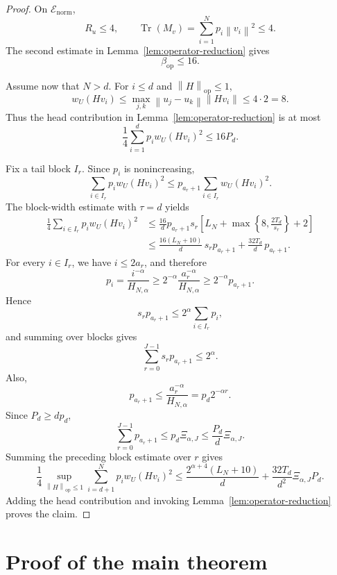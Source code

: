 \documentclass[11pt]{article}
\newcommand{\1}{\mathbf{1}}
\newcommand{\op}{\mathrm{op}}
\newcommand{\Tr}{\operatorname{Tr}}
\newcommand{\norm}[1]{\left\|#1\right\|}
\begin{document}
\begin{proof}
On \(\mathcal E_{\mathrm{norm}}\),
\[
 R_u\le4,
 \qquad
 \Tr(M_v)=\sum_{i=1}^N p_i\norm{v_i}^2\le4.
\]
The second estimate in Lemma~\ref{lem:operator-reduction} gives
\[
 \beta_{\op}\le16.
\]

Assume now that \(N>d\).  For \(i\le d\) and
\(\norm{H}_{\op}\le1\),
\[
 w_U(Hv_i)
 \le
 \max_{j,k}\norm{u_j-u_k}\norm{Hv_i}
 \le4\cdot2=8.
\]
Thus the head contribution in Lemma~\ref{lem:operator-reduction} is at most
\[
 \frac14\sum_{i=1}^d p_iw_U(Hv_i)^2
 \le16P_d.
\]

Fix a tail block \(I_r\).  Since \(p_i\) is nonincreasing,
\[
 \sum_{i\in I_r}p_iw_U(Hv_i)^2
 \le
 p_{a_r+1}\sum_{i\in I_r}w_U(Hv_i)^2.
\]
The block-width estimate with \(\tau=d\) yields
\begin{align*}
 \frac14\sum_{i\in I_r}p_iw_U(Hv_i)^2
 &\le
 \frac{16}{d}p_{a_r+1}s_r
 \left[
 L_N+\max\left\{8,\frac{2T_d}{s_r}\right\}+2
 \right]\\
 &\le
 \frac{16(L_N+10)}d\,s_rp_{a_r+1}
 +\frac{32T_d}{d}\,p_{a_r+1}.
\end{align*}
For every \(i\in I_r\), we have \(i\le2a_r\), and therefore
\[
 p_i
 =\frac{i^{-\alpha}}{H_{N,\alpha}}
 \ge
 2^{-\alpha}\frac{a_r^{-\alpha}}{H_{N,\alpha}}
 \ge
 2^{-\alpha}p_{a_r+1}.
\]
Hence
\[
 s_rp_{a_r+1}
 \le
 2^\alpha\sum_{i\in I_r}p_i,
\]
and summing over blocks gives
\[
 \sum_{r=0}^{J-1}s_rp_{a_r+1}\le2^\alpha.
\]
Also,
\[
 p_{a_r+1}
 \le
 \frac{a_r^{-\alpha}}{H_{N,\alpha}}
 =p_d2^{-\alpha r}.
\]
Since \(P_d\ge dp_d\),
\[
 \sum_{r=0}^{J-1}p_{a_r+1}
 \le
 p_d\Xi_{\alpha,J}
 \le
 \frac{P_d}{d}\Xi_{\alpha,J}.
\]
Summing the preceding block estimate over \(r\) gives
\[
 \frac14
 \sup_{\norm{H}_{\op}\le1}
 \sum_{i=d+1}^N p_iw_U(Hv_i)^2
 \le
 \frac{2^{\alpha+4}(L_N+10)}d
 +\frac{32T_d}{d^2}\Xi_{\alpha,J}P_d.
\]
Adding the head contribution and invoking
Lemma~\ref{lem:operator-reduction} proves the claim.
\end{proof}

\section{Proof of the main theorem}
\label{sec:main-proof}
\end{document}
